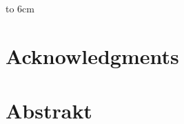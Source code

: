 



\ifx\draft\undefined
\chapter*{}

{~}\vspace{10cm}

\begin{minipage}{0.25\textwidth}~\end{minipage}
\begin{minipage}{0.69\textwidth}
\mfdeclaration

\bigskip\bigskip

\hfill\hbox to 6cm{\dotfill}
\end{minipage}
\vfill %
\fi


\ifx\draft\undefined
\chapter*{Acknowledgments} 

\mfacknowledgments
\fi


\ifx\draft\undefined

 \chapter*{Abstrakt}
%
%

